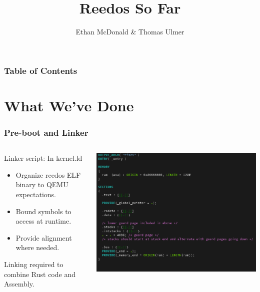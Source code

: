 \documentclass{beamer}
\author{Ethan McDonald \& Thomas Ulmer}
\title{Reedos So Far}
\begin{document}
\begin{frame}
  \maketitle
\end{frame}

\begin{frame}
  \frametitle{Table of Contents}
  \tableofcontents
\end{frame}

\section{What We've Done}

\begin{frame}
  \frametitle{Pre-boot and Linker}
  \begin{columns}
    \begin{column}{0.5\textwidth}
      Linker script:
      In kernel.ld
      \begin{itemize}
      \item Organize reedos ELF binary to QEMU expectations.\\
      \item Bound symbols to access at runtime.\\
      \item Provide alignment where needed.\\
      \end{itemize}
      Linking required to combine Rust code and Assembly.
    \end{column}

    \begin{column}{0.5\textwidth}
      \includegraphics[width=\textwidth]{linker.png}
    \end{column}

  \end{columns}

\end{frame}
\end{document}
